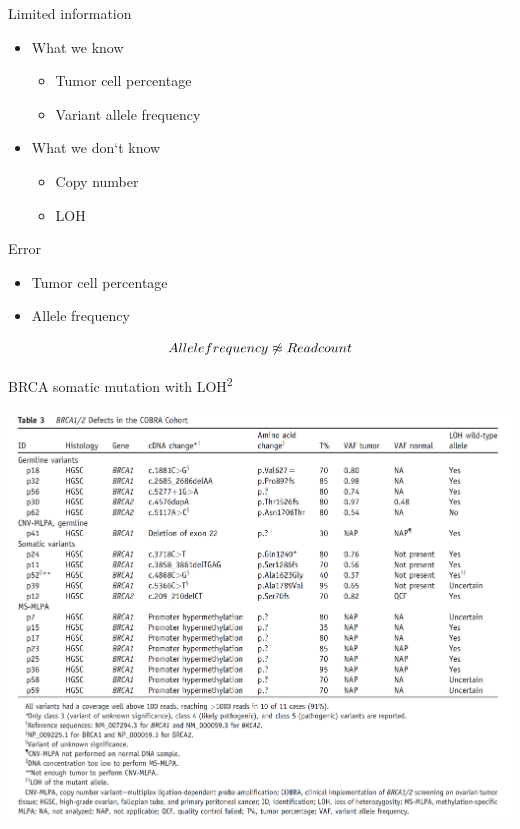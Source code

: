 \documentclass[
  ignorenonframetext,
]{beamer}
\providecommand{\tightlist}{%
  \setlength{\itemsep}{0pt}\setlength{\parskip}{0pt}}
\begin{document}
\begin{frame}{Limited information}
\protect\hypertarget{limited-information}{}

\begin{itemize}
\tightlist
\item
  What we know

  \begin{itemize}
  \tightlist
  \item
    Tumor cell percentage\\
  \item
    Variant allele frequency\\
  \end{itemize}
\item
  What we don`t know

  \begin{itemize}
  \tightlist
  \item
    Copy number\\
  \item
    LOH
  \end{itemize}
\end{itemize}

\end{frame}

\begin{frame}{Error}
\protect\hypertarget{error}{}

\begin{itemize}
\tightlist
\item
  Tumor cell percentage
\item
  Allele frequency
\end{itemize}

\[Allele \space frequency \not\approx Read \space count\]

\end{frame}

\begin{frame}{BRCA somatic mutation with LOH\textsuperscript{2}}
\protect\hypertarget{brca-somatic-mutation-with-loh--dejonge_2018_validation_thejournalofmoleculardiagnostics}{}

\includegraphics{LOH.png}

\end{frame}
\end{document}
